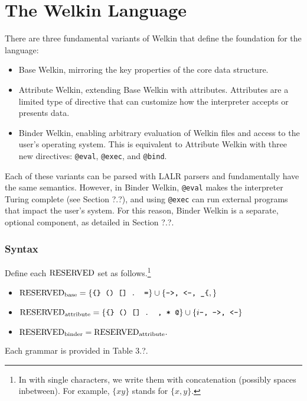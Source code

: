 \section{The Welkin Language}

There are three fundamental variants of Welkin that define the foundation for the language:
\begin{itemize}
	\item Base Welkin, mirroring the key properties of the core data structure.
	\item Attribute Welkin, extending Base Welkin with attributes. Attributes are a limited type of directive that can customize how the interpreter accepts or presents data.
	\item Binder Welkin, enabling arbitrary evaluation of Welkin files and access to the user's operating system. This is equivalent to Attribute Welkin with three new directives: \texttt{@eval}, \texttt{@exec}, and \texttt{@bind}. \end{itemize}
Each of these variants can be parsed with LALR parsers and fundamentally have the same semantics. However, in Binder Welkin, \texttt{@eval} makes the interpreter Turing complete (see Section ?.?), and using \texttt{@exec} can run external programs that impact the user's system. For this reason, Binder Welkin is a separate, optional component, as detailed in Section ?.?.

\subsubsection*{Syntax}
\label{section:syntax}
Define each $\mathrm{RESERVED}$ set as follows.\footnote{In with single characters, we write them with concatenation (possibly spaces inbetween). For example, $\{x y\}$ stands for $\{x, y\}.$}
\begin{itemize}
\item $\mathrm{RESERVED}_{\textrm{base}} = \{\texttt{\{\} () [] . =}\} \cup \{\texttt{->, <-, \_\{},\} $
  \item $\mathrm{RESERVED}_{\textrm{attribute}} = \{\texttt{\{\} () [] . , * @}\} \cup \{i\texttt{--, ->, <-}\}$ %
\item $\mathrm{RESERVED}_{\textrm{binder}} = \mathrm{RESERVED}_{\textrm{attribute}}.$
\end{itemize}
Each grammar is provided in Table 3.?.

